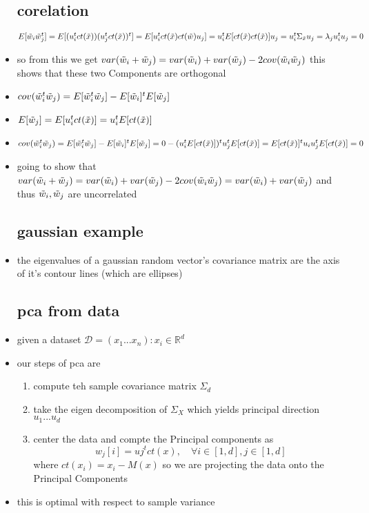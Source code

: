 \documentclass{article}
\begin{document}
\begin{itemize}
\subsection*{corelation}
$E[\Tilde{w}_{i}\Tilde{w}_{j}^t]=E[(u_i^{t}ct(\Tilde{x}))(u_j^{t}ct(\Tilde{x}))^{t}]=E[u_i^{t}ct(\Tilde{x})ct(\Tilde{w})u_j]=u_i^{t}E[ct(\Tilde{x})ct(\Tilde{x})]u_j=u_i^{t}\Sigma_{\Tilde{x}}u_{j}=\lambda_{j}u_i^{t}u_{j}=0$
\item so from this we get $var(\tilde{w}_{i}+\tilde{w}_{j})=var(\Tilde{w}_{i})+var(\Tilde{w}_{j})-2cov(\Tilde{w}_{i}\tilde{w}_{j})$ this shows that these two Components are orthogonal
\item $cov(\Tilde{w}_{i}^{t}\Tilde{w}_{j})=E[\Tilde{w}_{i}^{t}\Tilde{w}_{j}]-E[\Tilde{w}_{i}]^{t}E[\Tilde{w}_{j}]$
\item $E[\Tilde{w}_{j}]=E[u_{i}^{t}ct(\Tilde{x})]=u_i^{t}E[ct(\Tilde{x})]$
\item $cov(\Tilde{w}_{i}^{t}\Tilde{w}_{j})=E[\Tilde{w}_{i}^{t}\Tilde{w}_{j}]-E[\Tilde{w}_{i}]^{t}E[\Tilde{w}_{j}]=0-(u_i^{t}E[ct(\Tilde{x})])^{t}u_j^{t}E[ct(\Tilde{x})]=E[ct(\Tilde{x})]^{t}u_iu_j^{t}E[ct(\Tilde{x})]=0$
\item going to show that $var(\tilde{w}_{i}+\tilde{w}_{j})=var(\Tilde{w}_{i})+var(\Tilde{w}_{j})-2cov(\Tilde{w}_{i}\tilde{w}_{j})=var(\Tilde{w}_{i})+var(\Tilde{w}_{j})$ and thus $\Tilde{w}_{i}, \Tilde{w}_{j}$ are uncorrelated
\subsection*{gaussian example}
\item the eigenvalues of a gaussian random vector's covariance matrix are the axis of it's contour lines (which are ellipses)
\subsection*{pca from data}
\item given a dataset $\mathcal{D}=(x_1...x_n) : x_i\in \mathbb{R}^{d}$
\item our steps of pca are 
\begin{enumerate}
    \item compute teh sample covariance matrix $\Sigma_{d}$
    \item take the eigen decomposition of $\Sigma_{X}$ which yields principal direction $u_1...u_d$
    \item center the data and compte the Principal components as $$w_j[i]=uj^{t}ct(x), \quad \forall i\in [1,d], j\in [1,d]$$ where $ct(x_i)=x_i-M(x)$ so we are projecting the data onto the Principal Components
\end{enumerate}
\item this is optimal with respect to sample variance

\end{itemize}
\end{document}
